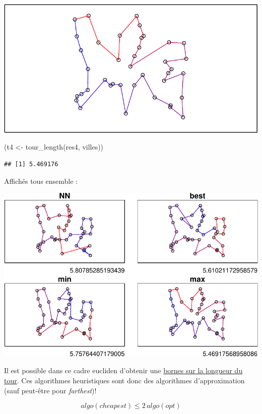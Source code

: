 \documentclass[
]{article}
\newenvironment{Shaded}{\begin{snugshade}}{\end{snugshade}}
\newcommand{\FunctionTok}[1]{\textcolor[rgb]{0.00,0.00,0.00}{#1}}
\newcommand{\NormalTok}[1]{#1}
\newcommand{\OtherTok}[1]{\textcolor[rgb]{0.56,0.35,0.01}{#1}}
\begin{document}
\includegraphics{rapport_TSP_files/figure-latex/unnamed-chunk-7-1.pdf}

\begin{Shaded}
\begin{Highlighting}[]
\NormalTok{(t4 }\OtherTok{\textless{}{-}} \FunctionTok{tour\_length}\NormalTok{(res4, villes))}
\end{Highlighting}
\end{Shaded}

\begin{verbatim}
## [1] 5.469176
\end{verbatim}

Affichés tous ensemble :

\includegraphics{rapport_TSP_files/figure-latex/unnamed-chunk-8-1.pdf}

Il est possible dans ce cadre eucliden d'obtenir une
\href{http://www.cs.albany.edu/~res/tsp_sicomp_1977.pdf}{bornes sur la
longueur du tour}. Ces algorithmes heuristiques sont donc des
algorithmes d'approximation (sauf peut-être pour \emph{farthest})!

\[algo(cheapest) \le 2 \,algo(opt)\]
\end{document}

